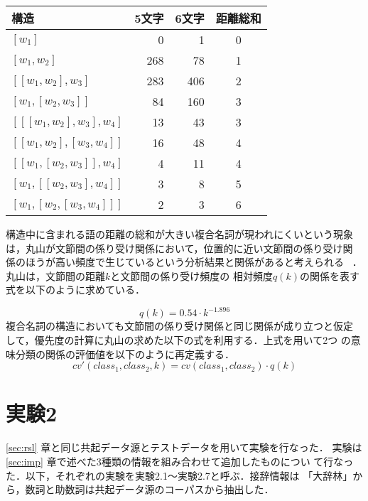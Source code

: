 \begin{center}
  \begin{tabular}{|l|r|r|c|}
    \hline
    構造 & 5文字 & 6文字 & 距離総和 \\
    \hline
    $[w_1]$ & 0 & 1 & 0\\
    \hline
    $[w_1, w_2]$ & 268 & 78 & 1 \\
    \hline
    $[[w_1,w_2],w_3]$ & 283 & 406 & 2 \\
    $[w_1,[w_2,w_3]]$ & 84 & 160 & 3 \\
    \hline
    $[[[w_1,w_2],w_3],w_4]$ & 13 & 43 & 3 \\
    $[[w_1,w_2],[w_3,w_4]]$ & 16 & 48 & 4 \\
    $[[w_1,[w_2,w_3]],w_4]$ & 4 & 11 & 4\\
    $[w_1,[[w_2,w_3],w_4]]$ & 3 & 8 & 5\\
    $[w_1,[w_2,[w_3,w_4]]]$ & 2 & 3  & 6\\
    \hline
  \end{tabular}
\end{center}
\bigskip

構造中に含まれる語の距離の総和が大きい複合名詞が現われにくいという現象
は，丸山が文節間の係り受け関係において，位置的に近い文節間の係り受け関
係のほうが高い頻度で生じているという分析結果と関係があると考えられる~
\cite{maruyama:92:a}．丸山は，文節間の距離$k$と文節間の係り受け頻度の
相対頻度$q(k)$の関係を表す式を以下のように求めている．

\begin{displaymath}
  q(k) = 0.54\cdot k^{-1.896}
\end{displaymath}
複合名詞の構造においても文節間の係り受け関係と同じ関係が成り立つと仮定
して，優先度の計算に丸山の求めた以下の式を利用する．上式を用いて2つ
の意味分類の関係の評価値を以下のように再定義する．
\begin{displaymath}
  cv'(class_1, class_2, k) = cv(class_1,class_2) \cdot q(k)
\end{displaymath}


\section{実験2}
\label{sec:rsl2}

\ref{sec:rsl} 章と同じ共起データ源とテストデータを用いて実験を行なった．
実験は\ref{sec:imp} 章で述べた3種類の情報を組み合わせて追加したものについ
て行なった．以下，それぞれの実験を実験2.1〜実験2.7と呼ぶ．接辞情報は
「大辞林」から，数詞と助数詞は共起データ源のコーパスから抽出した．

